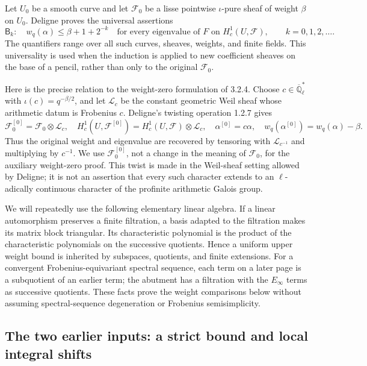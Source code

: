 Let \(U_0\) be a smooth curve and let \(\mathcal F_0\) be a lisse
pointwise \(\iota\)-pure sheaf of weight \(\beta\) on \(U_0\).
Deligne proves the universal assertions
\[
 \mathsf B_k:\quad
 w_q(\alpha)\le \beta+1+2^{-k}
 \quad\text{for every eigenvalue of }F
 \text{ on }H_c^1(U,\mathcal F),
 \qquad k=0,1,2,\ldots .
 \tag{WDB2}
\]
The quantifiers range over all such curves, sheaves, weights, and finite
fields. This universality is used when the induction is applied to new
coefficient sheaves on the base of a pencil, rather than only to the
original \(\mathcal F_0\).

Here is the precise relation to the weight-zero formulation of 3.2.4.
Choose \(c\in\overline{\mathbb Q}_\ell^*\) with
\(\iota(c)=q^{-\beta/2}\), and let \(\mathcal L_c\) be the
constant geometric Weil sheaf whose arithmetic datum is Frobenius
\(c\). Deligne's twisting operation 1.2.7 gives
\[
 \mathcal F_0^{[0]}=\mathcal F_0\otimes\mathcal L_c,
 \quad
 H_c^1(U,\mathcal F^{[0]})
   =H_c^1(U,\mathcal F)\otimes\mathcal L_c,
 \quad
 \alpha^{[0]}=c\alpha,
 \quad w_q(\alpha^{[0]})=w_q(\alpha)-\beta.
 \tag{WDB3}
\]
Thus the original weight and eigenvalue are recovered by tensoring with
\(\mathcal L_{c^{-1}}\) and multiplying by \(c^{-1}\). We use
\(\mathcal F_0^{[0]}\), not a change in the meaning of
\(\mathcal F_0\), for the auxiliary weight-zero proof. This twist is
made in the Weil-sheaf setting allowed by Deligne; it is not an assertion
that every such character extends to an \(\ell\)-adically continuous
character of the profinite arithmetic Galois group.

We will repeatedly use the following elementary linear algebra. If a
linear automorphism preserves a finite filtration, a basis adapted to
the filtration makes its matrix block triangular. Its characteristic
polynomial is the product of the characteristic polynomials on the
successive quotients. Hence a uniform upper weight bound is inherited
by subspaces, quotients, and finite extensions. For a convergent
Frobenius-equivariant spectral sequence, each term on a later page is
a subquotient of an earlier term; the abutment has a filtration with
the \(E_\infty\) terms as successive quotients. These facts prove the
weight comparisons below without assuming spectral-sequence
degeneration or Frobenius semisimplicity.

\subsection{The two earlier inputs: a strict bound and local integral shifts}

